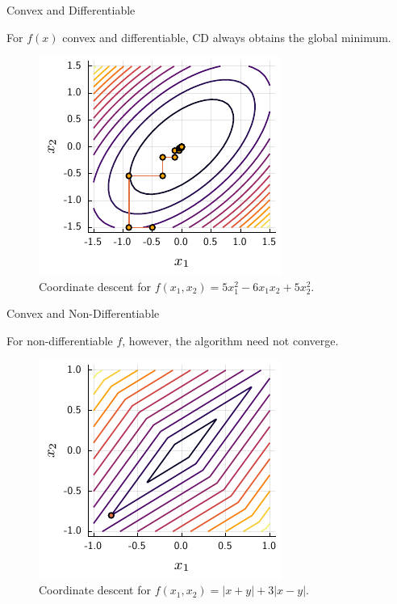 \documentclass[10pt,ignorenonframetext]{beamer}
\begin{document}
\begin{frame}{Convex and Differentiable}

For \(f(x)\) \alert{convex} and \alert{differentiable}, CD always obtains the global minimum.

\begin{figure}
    \centering
    \includegraphics{figures/cd-convex-differentiable.pdf}
    \caption{Coordinate descent for \(f(x_1,x_2) = 5x_1^2 - 6x_1x_2 + 5x_2^2\).}
\end{figure}

\end{frame}

\begin{frame}{Convex and Non-Differentiable}

For \alert{non-differentiable} \(f\), however, the algorithm need not converge.

\begin{figure}
    \centering
    \includegraphics{figures/cd-non-differentiable.pdf}
    \caption{Coordinate descent for \(f(x_1,x_2) = |x + y| + 3|x-y|\).}
\end{figure}
\end{frame}
\end{document}
